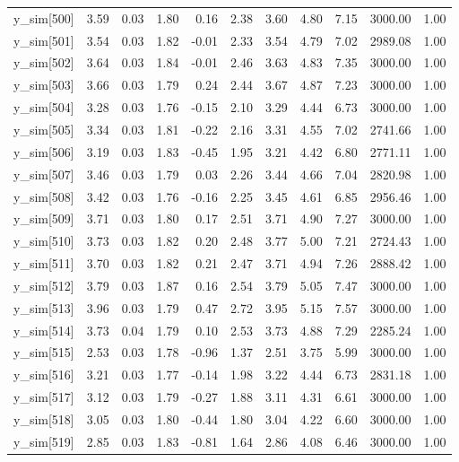 \begin{table}[ht]
\begin{tabular}{rrrrrrrrrrr}
  y\_sim[500] & 3.59 & 0.03 & 1.80 & 0.16 & 2.38 & 3.60 & 4.80 & 7.15 & 3000.00 & 1.00 \\ 
  y\_sim[501] & 3.54 & 0.03 & 1.82 & -0.01 & 2.33 & 3.54 & 4.79 & 7.02 & 2989.08 & 1.00 \\ 
  y\_sim[502] & 3.64 & 0.03 & 1.84 & -0.01 & 2.46 & 3.63 & 4.83 & 7.35 & 3000.00 & 1.00 \\ 
  y\_sim[503] & 3.66 & 0.03 & 1.79 & 0.24 & 2.44 & 3.67 & 4.87 & 7.23 & 3000.00 & 1.00 \\ 
  y\_sim[504] & 3.28 & 0.03 & 1.76 & -0.15 & 2.10 & 3.29 & 4.44 & 6.73 & 3000.00 & 1.00 \\ 
  y\_sim[505] & 3.34 & 0.03 & 1.81 & -0.22 & 2.16 & 3.31 & 4.55 & 7.02 & 2741.66 & 1.00 \\ 
  y\_sim[506] & 3.19 & 0.03 & 1.83 & -0.45 & 1.95 & 3.21 & 4.42 & 6.80 & 2771.11 & 1.00 \\ 
  y\_sim[507] & 3.46 & 0.03 & 1.79 & 0.03 & 2.26 & 3.44 & 4.66 & 7.04 & 2820.98 & 1.00 \\ 
  y\_sim[508] & 3.42 & 0.03 & 1.76 & -0.16 & 2.25 & 3.45 & 4.61 & 6.85 & 2956.46 & 1.00 \\ 
  y\_sim[509] & 3.71 & 0.03 & 1.80 & 0.17 & 2.51 & 3.71 & 4.90 & 7.27 & 3000.00 & 1.00 \\ 
  y\_sim[510] & 3.73 & 0.03 & 1.82 & 0.20 & 2.48 & 3.77 & 5.00 & 7.21 & 2724.43 & 1.00 \\ 
  y\_sim[511] & 3.70 & 0.03 & 1.82 & 0.21 & 2.47 & 3.71 & 4.94 & 7.26 & 2888.42 & 1.00 \\ 
  y\_sim[512] & 3.79 & 0.03 & 1.87 & 0.16 & 2.54 & 3.79 & 5.05 & 7.47 & 3000.00 & 1.00 \\ 
  y\_sim[513] & 3.96 & 0.03 & 1.79 & 0.47 & 2.72 & 3.95 & 5.15 & 7.57 & 3000.00 & 1.00 \\ 
  y\_sim[514] & 3.73 & 0.04 & 1.79 & 0.10 & 2.53 & 3.73 & 4.88 & 7.29 & 2285.24 & 1.00 \\ 
  y\_sim[515] & 2.53 & 0.03 & 1.78 & -0.96 & 1.37 & 2.51 & 3.75 & 5.99 & 3000.00 & 1.00 \\ 
  y\_sim[516] & 3.21 & 0.03 & 1.77 & -0.14 & 1.98 & 3.22 & 4.44 & 6.73 & 2831.18 & 1.00 \\ 
  y\_sim[517] & 3.12 & 0.03 & 1.79 & -0.27 & 1.88 & 3.11 & 4.31 & 6.61 & 3000.00 & 1.00 \\ 
  y\_sim[518] & 3.05 & 0.03 & 1.80 & -0.44 & 1.80 & 3.04 & 4.22 & 6.60 & 3000.00 & 1.00 \\ 
  y\_sim[519] & 2.85 & 0.03 & 1.83 & -0.81 & 1.64 & 2.86 & 4.08 & 6.46 & 3000.00 & 1.00 \\ 

\end{tabular}
\end{table}
